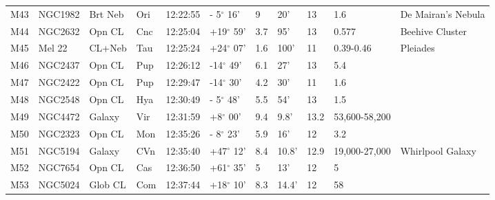 \documentclass[10pt,twoside,a4paper,english]{article}
\begin{document}
\begin{longtable}{@{}lllllllllll@{}}
M43        & NGC1982     & Brt Neb    & Ori       & 12:22:55 & - 5$^{\circ}$ 16'  & 9         & 20'                  & 13       & 1.6                 & De Mairan's Nebula                        \\ 
M44        & NGC2632     & Opn CL     & Cnc       & 12:25:04 & +19$^{\circ}$ 59'  & 3.7       & 95'                  & 13       & 0.577               & Beehive Cluster                           \\ 
M45        & Mel 22      & CL+Neb     & Tau       & 12:25:24 & +24$^{\circ}$ 07'  & 1.6       & 100'                 & 11       & 0.39-0.46           & Pleiades                                  \\ 
M46        & NGC2437     & Opn CL     & Pup       & 12:26:12 & -14$^{\circ}$ 49'  & 6.1       & 27'                  & 13       & 5.4                 &                                           \\ 
M47        & NGC2422     & Opn CL     & Pup       & 12:29:47 & -14$^{\circ}$ 30'  & 4.2       & 30'                  & 11       & 1.6                 &                                           \\ 
M48        & NGC2548     & Opn CL     & Hya       & 12:30:49 & - 5$^{\circ}$ 48'  & 5.5       & 54'                  & 13       & 1.5                 &                                           \\ 
M49        & NGC4472     & Galaxy     & Vir       & 12:31:59 & +8$^{\circ}$ 00'   & 9.4       & 9.8'                 & 13.2     & 53,600-58,200       &                                           \\ 
M50        & NGC2323     & Opn CL     & Mon       & 12:35:26 & - 8$^{\circ}$ 23'  & 5.9       & 16'                  & 12       & 3.2                 &                                           \\ 
M51        & NGC5194     & Galaxy     & CVn       & 12:35:40 & +47$^{\circ}$ 12'  & 8.4       & 10.8'                & 12.9     & 19,000-27,000       & Whirlpool Galaxy                          \\ 
M52        & NGC7654     & Opn CL     & Cas       & 12:36:50 & +61$^{\circ}$ 35'  & 5         & 13'                  & 12       & 5                   &                                           \\ 
M53        & NGC5024     & Glob CL    & Com       & 12:37:44 & +18$^{\circ}$ 10'  & 8.3       & 14.4'                & 12       & 58                  &                                           \\ 

\end{longtable}
\end{document}
